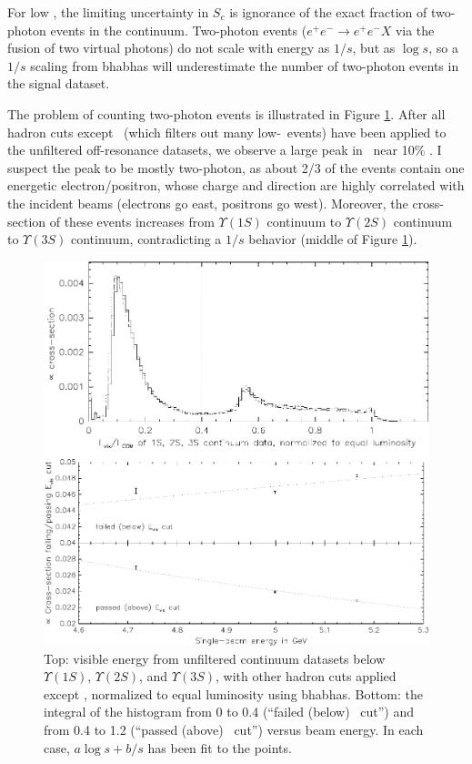For low \visen, the limiting uncertainty in $S_c$ is ignorance of the
exact fraction of two-photon events in the continuum.  Two-photon
events ($e^+e^- \to e^+e^- X$ via the fusion of two virtual photons)
do not scale with energy as $1/s$, but as $\log s$, so a $1/s$ scaling
from bhabhas will underestimate the number of two-photon events in the
signal dataset.

The problem of counting two-photon events is illustrated in Figure
\ref{datasets:visen_continuum}.  After all hadron cuts except
\lfourdec\ (which filters out many low-\visen\ events) have been
applied to the unfiltered off-resonance datasets, we observe a large
peak in \visen\ near 10\% \ecom.  I suspect the peak to be mostly
two-photon, as about 2/3 of the events contain one energetic
electron/positron, whose charge and direction are highly correlated
with the incident beams (electrons go east, positrons go west).
Moreover, the cross-section of these events increases from
$\Upsilon(1S)$ continuum to $\Upsilon(2S)$ continuum to $\Upsilon(3S)$
continuum, contradicting a $1/s$ behavior (middle of Figure
\ref{datasets:visen_continuum}).

\begin{figure}[p]
  \begin{center}
    \includegraphics[width=\linewidth]{plots/datasets_twophoton_visen}
  \end{center}
  \caption{\label{datasets:visen_continuum} Top: visible energy from
    unfiltered continuum datasets below $\Upsilon(1S)$,
    $\Upsilon(2S)$, and $\Upsilon(3S)$, with other hadron cuts applied
    except \lfourdec, normalized to equal luminosity using bhabhas.
    Bottom: the integral of the histogram from 0 to 0.4 (``failed
    (below) \visen\ cut'') and from 0.4 to 1.2 (``passed (above)
    \visen\ cut'') versus beam energy.  In each case, $a \log s + b/s$
    has been fit to the points.}
\end{figure}

